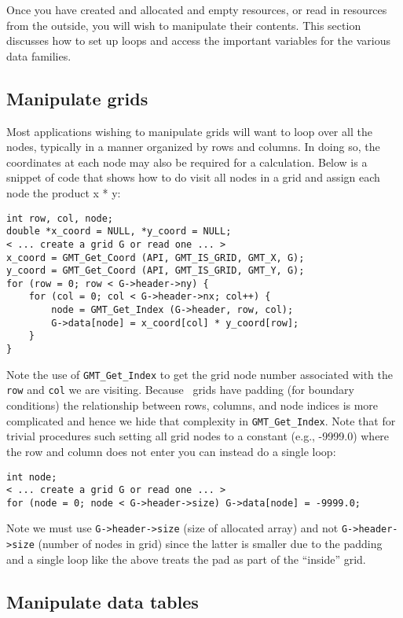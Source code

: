 \documentclass[11pt]{report}
\begin{document}
Once you have created and allocated and empty resources, or read in resources from the outside, you
will wish to manipulate their contents.  This section discusses how to set up loops and access
the important variables for the various data families.

\subsection{Manipulate grids}

Most applications wishing to manipulate grids will want to loop over all the nodes, typically
in a manner organized by rows and columns.  In doing so, the coordinates at each node may also
be required for a calculation.  Below is a snippet of code that shows how to do
visit all nodes in a grid and assign each node the product x * y:

\begin{verbatim}
int row, col, node;
double *x_coord = NULL, *y_coord = NULL;
< ... create a grid G or read one ... >
x_coord = GMT_Get_Coord (API, GMT_IS_GRID, GMT_X, G);
y_coord = GMT_Get_Coord (API, GMT_IS_GRID, GMT_Y, G);
for (row = 0; row < G->header->ny) {
    for (col = 0; col < G->header->nx; col++) {
        node = GMT_Get_Index (G->header, row, col);
        G->data[node] = x_coord[col] * y_coord[row];
    }
}
\end{verbatim}

Note the use of \texttt{GMT\_Get\_Index} to get the grid node number associated
with the \texttt{row} and \texttt{col} we are visiting.  Because \GMT\ grids have
padding (for boundary conditions) the relationship between rows, columns, and
node indices is more complicated and hence we hide that complexity in \texttt{GMT\_Get\_Index}.
Note that for trivial procedures such setting all grid nodes to a constant (e.g., -9999.0)
where the row and column does not enter you can instead do a single loop:

\begin{verbatim}
int node;
< ... create a grid G or read one ... >
for (node = 0; node < G->header->size) G->data[node] = -9999.0;
\end{verbatim}

Note we must use \texttt{G->header->size} (size of allocated array) and not
\texttt{G->header->size} (number of nodes in grid) since the latter is smaller
due to the padding and a single loop like the above treats the pad as part of
the ``inside'' grid.

\subsection{Manipulate data tables}
\end{document}
